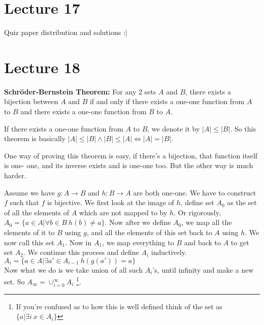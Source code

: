 \documentclass[a4paper,10pt]{article}
\theoremstyle{definition} %
\begin{document}
    \section{Lecture 17}

    Quiz paper distribution and solutions :|

    \section{Lecture 18}

    \textbf{Schr\"{o}der-Bernstein Theorem:} For any 2 sets $A$ and $B$, there exists a bijection
    between $A$ and $B$ if and only if there exists a one-one function from $A$ to $B$ and there
    exists a one-one function from $B$ to $A$.

    If there exists a one-one function from $A$ to $B$, we denote it by $|A| \leq |B|$. So this 
    theorem is basically $|A| \leq |B| \land |B| \leq |A| \iff |A| = |B|$.

    One way of proving this theorem is easy, if there's a bijection, that function itself is one-
    one, and its inverse exists and is one-one too. But the other way is much harder.

    Assume we have $g: A \rightarrow B$ and $h: B \rightarrow A$ are both one-one. We have to 
    construct $f$ such that $f$ is bijective. We first look at the image of $h$, define set
    $A_0$ as the set of all the elements of $A$ which are not mapped to by $h$. Or rigorously,
    $A_0 = \{ a \in A | \forall b \in B \ h(b) \neq a \}$. Now after we define $A_0$, we map all
    the elements of it to $B$ using $g$, and all the elements of this set back to $A$ using $h$.
    We now call this set $A_1$. Now in $A_1$, we map everything to $B$ and back to $A$ to get 
    set $A_2$. We continue this process and define $A_i$ inductively. \\
    $A_i = \{a \in A | \exists a' \in A_{i-1} \ h(g(a')) = a \}$ \\
    Now what we do is we take union of all such $A_i$'s, until infinity and make a new set. 
    So $A_\infty = \cup_{i=0}^{\infty} A_i$
    \footnote {If you're confused as to how this is well defined think of the set as 
    $\{a | \exists i \ x \in A_i \}$}.
\end{document}
